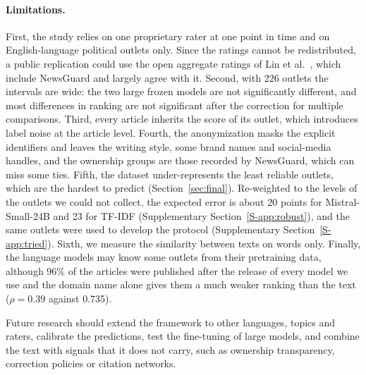 \documentclass[11pt,a4paper]{article}
\begin{document}
\paragraph{Limitations.} First, the study relies on one proprietary rater at one point in time and on English-language
political outlets only. Since the ratings cannot be redistributed, a public replication could use the open aggregate
ratings of Lin et al.~\cite{lin2023high}, which include NewsGuard and largely agree with it. Second, with 226 outlets the
intervals are wide: the two large frozen models are not significantly different, and most differences in ranking are
not significant after the correction for multiple comparisons. Third, every article inherits the score of its outlet,
which introduces label noise at the article level. Fourth, the anonymization masks the explicit identifiers and leaves
the writing style, some brand names and social-media handles, and the ownership groups are those recorded by NewsGuard,
which can miss some ties. Fifth, the dataset under-represents the least reliable outlets, which are the hardest to
predict (Section~\ref{sec:final}). Re-weighted to the levels of the outlets we could not collect, the expected error is
about 20 points for Mistral-Small-24B and 23 for TF-IDF (Supplementary Section~\ref{S-app:robust}), and the same outlets
were used to develop the protocol (Supplementary Section~\ref{S-app:tried}). Sixth, we measure the similarity between
texts on words only. Finally, the language models may know some outlets from their pretraining data, although 96\% of
the articles were published after the release of every model we use and the domain name alone gives them a much weaker
ranking than the text ($\rho = 0.39$ against 0.735).

Future research should extend the framework to other languages, topics and raters, calibrate the predictions, test the
fine-tuning of large models, and combine the text with signals that it does not carry, such as ownership transparency,
correction policies or citation networks.
\end{document}
